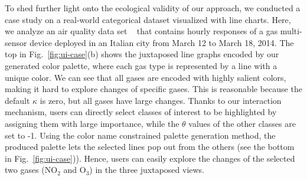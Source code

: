 To shed further light onto the ecological validity of our approach, we conducted a case study on a real-world categorical dataset visualized with line charts.
Here, we analyze an air quality data set ~\cite{DEVITO2008750} that contains hourly responses of a gas multi-sensor device deployed in an Italian city from March 12 to March 18, 2014.
The top in Fig.~\ref{fig:ui-case}(b) shows the juxtaposed line graphs encoded by our generated color palette, where each gas type is represented by a line with a unique color.
We can see that all gases are encoded with highly salient colors, making it hard to explore changes of specific gases. This is reasonable because the default $\kappa$ is zero, but all gases have large changes.
Thanks to our interaction mechanism, users can directly select classes of interest to be highlighted by assigning them with large importance, while  the $\theta$ values of the other classes are set to -1. Using the color name constrained palette generation method, the produced palette lets the selected lines pop out from the others (see the bottom in Fig.~\ref{fig:ui-case})). Hence, users can easily explore the changes of the selected two gases (NO$_2$ and O$_3$) in the three juxtaposed views.


